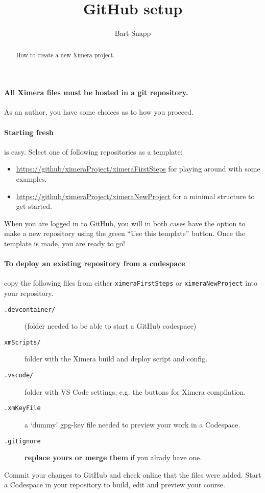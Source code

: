 \documentclass{ximera}
\title{GitHub setup}
\author{Bart Snapp}
\begin{document}
\begin{abstract}
    How to create a new Ximera project.
\end{abstract}
\maketitle

\paragraph{All Ximera files must be hosted in a git repository.}
As an author, you have some choices as to how you proceed.

\paragraph{Starting fresh} is easy.
Select one of following repositories as a template:
\begin{itemize}
    \item \url{https://github/ximeraProject/ximeraFirstSteps} for playing around with some examples.
    \item \url{https://github/ximeraProject/ximeraNewProject} for a minimal structure to get started.
\end{itemize}
When you are logged in to GitHub, you
will in both cases have the option to make a new repository using the green ``Use this
template'' button. Once the template is made, you are ready to go!

\paragraph{To deploy an existing repository from a codespace} copy the
following files from either \verb!ximeraFirstSteps! or \verb!ximeraNewProject!
into your repository.
\begin{description}
    \item[\texttt{.devcontainer/}] (folder needed to be able to start 
          a
          GitHub codespace)
    \item[\texttt{xmScripts/}] folder with the Ximera build and deploy script and config.
    \item[\texttt{.vscode/}] folder with VS Code
        settings, e.g.  the buttons for Ximera compilation.
    \item[\texttt{.xmKeyFile}] a `dummy' gpg-key file needed to preview your work in a Codespace.
    \item[\texttt{.gitignore}]  \textbf{replace yours or merge them} if you alrady have one.
\end{description}
Commit your changes to GitHub and check online that the files were added.
Start a Codespace in your repository to build, edit and preview your course.
\end{document}

